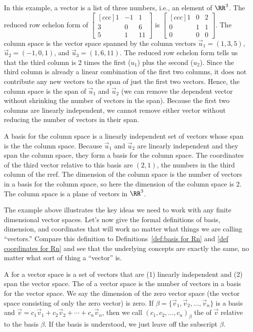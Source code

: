\begin{example}
In this example, a vector is a list of three numbers, i.e., an element of $\RR^3$.
The reduced row echelon form of 
$\begin{bmatrix}[ccc] 1&-1&1\\3&0&6\\5&1&11\end{bmatrix}$ 
is 
$\begin{bmatrix}[ccc] 1&0&2\\0&1&1\\0&0&0\end{bmatrix}$. 
The column space is the vector space spanned by the column vectors 
$\vec u_1= (1,3,5)$, 
$\vec u_2= (-1,0,1)$, and 
$\vec u_3= (1,6,11)$.
The reduced row echelon form tells us that the third column is 2 times the first ($u_1$) plus the second ($u_2$).   
Since the third column is already a linear combination of the first two columns, it does not contribute any new vectors to the span of just the first two vectors.  
Hence, the column space is the span of $\vec u_1$ and $\vec u_2$ (we can remove the dependent vector without shrinking the number of vectors in the span). 
Because the first two columns are linearly independent, we cannot remove either vector without reducing the number of vectors in their span.

A basis for the column space is a linearly independent set of vectors whose span is the the column space. 
Because $\vec u_1$ and $\vec u_2$ are linearly independent and they span the column space, they form a basis for the column space. 
The coordinates of the third vector relative to this basis are $(2,1)$, the numbers in the third column of the rref.  
The dimension of the column space is the number of vectors in a basis for the column space, so here the dimension of the column space is 2.  The column space is a plane of vectors in $\RR^3$.
\end{example}

The example above illustrates the key ideas we need to work with any finite dimensional vector spaces.  Let's now give the formal definitions of basis, dimension, and coordinates that will work no matter what things we are calling ``vectors.''  Compare this definition to Definitions~\ref{def:basis for Rn} and \ref{def coordinates for Rn} and see that the underlying concepts are exactly the same, no matter what sort of thing a ``vector'' is.

\begin{definition}
A  for a vector space is a set of vectors that are 
(1) linearly independent and (2) span the vector space.
The  of a vector space is the number of vectors in a basis for the vector space. 
We say the dimension of the zero vector space (the vector space consisting of only the zero vector) is zero. 
If $\beta=\{\vec v_1,\vec v_2,\ldots,\vec v_n\}$ is a basis and $\vec v = c_1\vec v_1+c_2\vec v_2+\cdots+c_n\vec v_n$, then we call $(c_1,c_2,\ldots,c_n)_\beta$ the  of $\vec v$ relative to the basis $\beta$. 
If the basis is understood, we just leave off the subscript $\beta$.
\end{definition}

